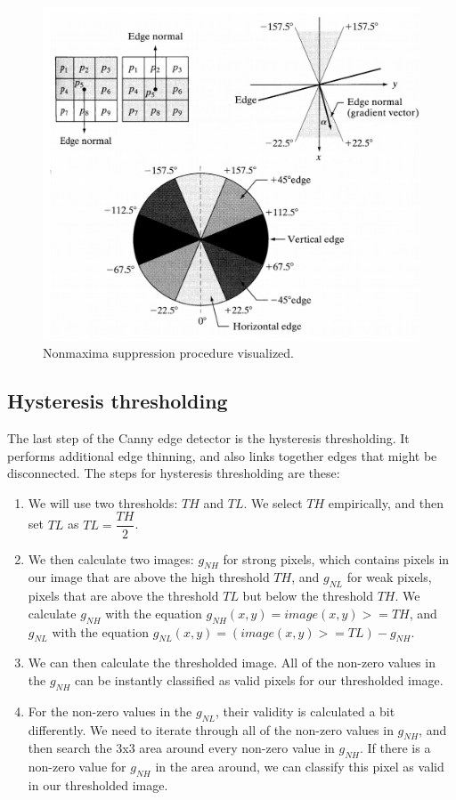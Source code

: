 \documentclass[9pt]{IEEEtran}
\begin{document}
\begin{figure}[!htb]
\centering
\includegraphics[width=1\columnwidth]{nonmaxima_suppression.png}
\caption[c1]{ Nonmaxima suppression procedure visualized. }
\label{fig_4}
\end{figure}

\subsection{Hysteresis thresholding}

The last step of the Canny edge detector is the hysteresis thresholding. It performs additional edge thinning, and also links together edges that might be disconnected. The steps for hysteresis thresholding are these:

\begin{enumerate}
\item We will use two thresholds: $TH$ and $TL$. We select $TH$ empirically, and then set $TL$ as $TL = \dfrac{TH}{2}$.
\item We then calculate two images: $g_{NH}$ for strong pixels, which contains pixels in our image that are above the high threshold $TH$, and $g_{NL}$ for weak pixels, pixels that are above the threshold $TL$ but below the threshold $TH$. We calculate $g_{NH}$  with the equation $g_{NH}(x,y) = image(x,y) >= TH$, and  $g_{NL}$ with the equation $g_{NL}(x, y) = (image(x, y) >= TL) - g_{NH}$.
\item We can then calculate the thresholded image. All of the non-zero values in the $g_{NH}$ can be instantly classified as valid pixels for our thresholded image.
\item For the non-zero values in the $g_{NL}$, their validity is calculated a bit differently. We need to iterate through all of the non-zero values in $g_{NH}$, and then search the 3x3 area around every non-zero value in $g_{NH}$. If there is a non-zero value for  $g_{NH}$ in the area around, we can classify this pixel as valid in our thresholded image. 
\end{enumerate}
\end{document}
